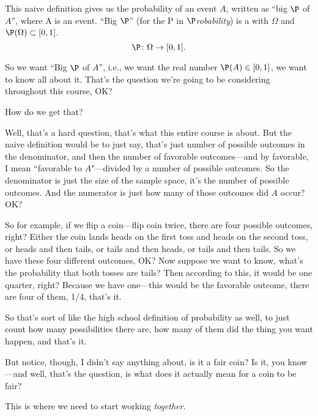 \documentclass{ccg-topic}
\begin{document}
This naive definition gives us the probability of an event $A$, written as ``big $\P$ of $A$'', where A is an event. ``Big $\P$'' (for the P in $\P$\emph{robability}) is a  with  $\Omega$ and  $\P(\Omega) \subset [0,1]$. 
\begin{equation*}
    \label{eq:probability_measure}
    \P \colon \Omega \to [0,1].
\end{equation*}

So we want ``Big $\P$ of $A$'', i.e., we want the real number $\P(A) \in [0,1]$, we want to know all about it.
That's the question we're going to be considering throughout this course, OK? 

How do we get that?

    Well, that's a hard question, that's what this entire course is about. But the naive definition would be to just say, that's just number of possible outcomes in the denominator, and then the number of favorable outcomes---and by favorable, I mean ``favorable to $A$"---divided by a number of possible outcomes. So the denominator is just the size of the sample space, it's the number of possible outcomes. And the numerator is just how many of those outcomes did $A$ occur? OK?

So for example, if we flip a coin---flip coin twice, there are four possible outcomes, right?
Either the coin lands heads on the first toss and heads on the second toss, or heads and then tails, or tails and then heads, or tails and then tails. So we have these four different outcomes, OK? Now suppose we want to know, what's the probability that both tosses are tails? Then according to this, it would be one quarter, right? Because we have one---this would be the favorable outcome, there are four of them, 1/4, that's it.

So that's sort of like the high school definition of probability as well, to just count how many possibilities there are,
how many of them did the thing you want happen, and that's it.

But notice, though, I didn't say anything about, is it a fair coin?
Is it, you know---and well, that's the question, is what does it actually mean for a coin to be fair?

This is where we need to start working \emph{together}.
\end{document}
